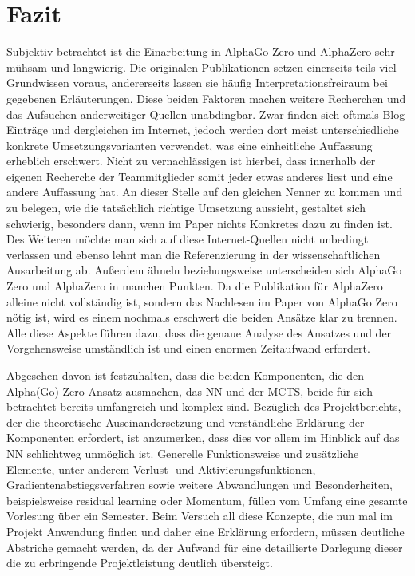 \documentclass[12pt,a4paper]{article}
\begin{document}
\newpage
\section{Fazit}

Subjektiv betrachtet ist die Einarbeitung in AlphaGo Zero und AlphaZero sehr mühsam und langwierig. Die originalen Publikationen setzen einerseits teils viel Grundwissen voraus, andererseits lassen sie häufig Interpretationsfreiraum bei gegebenen Erläuterungen. Diese beiden Faktoren machen weitere Recherchen und das Aufsuchen anderweitiger Quellen unabdingbar. Zwar finden sich oftmals Blog-Einträge und dergleichen im Internet, jedoch werden dort meist unterschiedliche konkrete Umsetzungsvarianten verwendet, was eine einheitliche Auffassung erheblich erschwert. Nicht zu vernachlässigen ist hierbei, dass innerhalb der eigenen Recherche der Teammitglieder somit jeder etwas anderes liest und eine andere Auffassung hat. An dieser Stelle auf den gleichen Nenner zu kommen und zu belegen, wie die tatsächlich richtige Umsetzung aussieht, gestaltet sich schwierig, besonders dann, wenn im Paper nichts Konkretes dazu zu finden ist. Des Weiteren möchte man sich auf diese Internet-Quellen nicht unbedingt verlassen und ebenso lehnt man die Referenzierung in der wissenschaftlichen Ausarbeitung ab. Außerdem ähneln beziehungsweise unterscheiden sich AlphaGo Zero und AlphaZero in manchen Punkten. Da die Publikation für AlphaZero alleine nicht vollständig ist, sondern das Nachlesen im Paper von AlphaGo Zero nötig ist, wird es einem nochmals erschwert die beiden Ansätze klar zu trennen. Alle diese Aspekte führen dazu, dass die genaue Analyse des Ansatzes und der Vorgehensweise umständlich ist und einen enormen Zeitaufwand erfordert. 

Abgesehen davon ist festzuhalten, dass die beiden Komponenten, die den Alpha(Go)-Zero-Ansatz ausmachen, das NN und der MCTS, beide für sich betrachtet bereits umfangreich und komplex sind. Bezüglich des Projektberichts, der die theoretische Auseinandersetzung und verständliche Erklärung der Komponenten erfordert, ist anzumerken, dass dies vor allem im Hinblick auf das NN schlichtweg unmöglich ist. Generelle Funktionsweise und zusätzliche Elemente, unter anderem Verlust- und Aktivierungsfunktionen, Gradientenabstiegsverfahren sowie weitere Abwandlungen und Besonderheiten, beispielsweise residual learning oder Momentum, füllen vom Umfang eine gesamte Vorlesung über ein Semester. Beim Versuch all diese Konzepte, die nun mal im Projekt Anwendung finden und daher eine Erklärung erfordern, müssen deutliche Abstriche gemacht werden, da der Aufwand für eine detaillierte Darlegung dieser die zu erbringende Projektleistung deutlich übersteigt.
\end{document}
